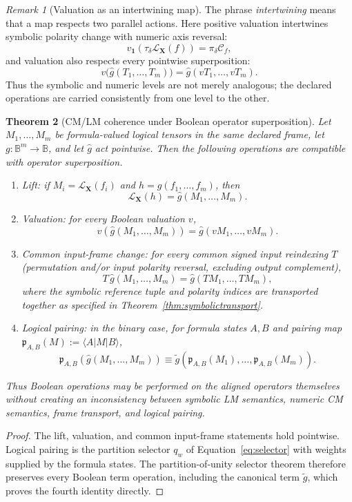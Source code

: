 \documentclass[11pt]{article}
\newtheorem{theorem}{Theorem}[section]
\theoremstyle{definition}
\theoremstyle{remark}
\newtheorem{remark}[theorem]{Remark}
\newcommand{\B}{\mathbb B}
\newcommand{\cC}{\mathcal C}
\begin{document}
\begin{remark}[Valuation as an intertwining map]
The phrase \emph{intertwining} means that a map respects two parallel actions.  Here positive valuation intertwines symbolic polarity change with numeric axis reversal:
\[
 v_{\mathbf1}\!\left(\tau_\delta\mathcal L_{\mathbf X}(f)\right)
 =\pi_\delta\cC_f,
\]
and valuation also respects every pointwise superposition:
\[
 v\bigl(\widehat g(T_1,\ldots,T_m)\bigr)
 =\widehat g(vT_1,\ldots,vT_m).
\]
Thus the symbolic and numeric levels are not merely analogous; the declared operations are carried consistently from one level to the other.
\end{remark}

\begin{theorem}[CM/LM coherence under Boolean operator superposition]
\label{thm:coherence}
Let $M_1,\ldots,M_m$ be formula-valued logical tensors in the same declared frame, let $g:\B^m\to\B$, and let $\widehat g$ act pointwise.  Then the following operations are compatible with operator superposition.
\begin{enumerate}
\item \emph{Lift:} if $M_i=\mathcal L_{\mathbf X}(f_i)$ and $h=g(f_1,\ldots,f_m)$, then
\[
 \mathcal L_{\mathbf X}(h)=\widehat g(M_1,\ldots,M_m).
\]
\item \emph{Valuation:} for every Boolean valuation $v$,
\[
 v\!\left(\widehat g(M_1,\ldots,M_m)\right)
 =\widehat g(vM_1,\ldots,vM_m).
\]
\item \emph{Common input-frame change:} for every common signed input reindexing $T$ (permutation and/or input polarity reversal, excluding output complement),
\[
 T\,\widehat g(M_1,\ldots,M_m)
 =\widehat g(TM_1,\ldots,TM_m),
\]
where the symbolic reference tuple and polarity indices are transported together as specified in Theorem~\ref{thm:symbolictransport}.
\item \emph{Logical pairing:} in the binary case, for formula states $A,B$ and pairing map $\mathfrak p_{A,B}(M):=\langle A|M|B\rangle$,
\[
 \mathfrak p_{A,B}\!\left(\widehat g(M_1,\ldots,M_m)\right)
 \equiv
 \widetilde g\!\left(\mathfrak p_{A,B}(M_1),\ldots,\mathfrak p_{A,B}(M_m)\right).
\]
\end{enumerate}
Thus Boolean operations may be performed on the aligned operators themselves without creating an inconsistency between symbolic LM semantics, numeric CM semantics, frame transport, and logical pairing.
\end{theorem}
\begin{proof}
The lift, valuation, and common input-frame statements hold pointwise.  Logical pairing is the partition selector $q_w$ of Equation~\eqref{eq:selector} with weights supplied by the formula states.  The partition-of-unity selector theorem therefore preserves every Boolean term operation, including the canonical term $\widetilde g$, which proves the fourth identity directly.
\end{proof}
\end{document}
